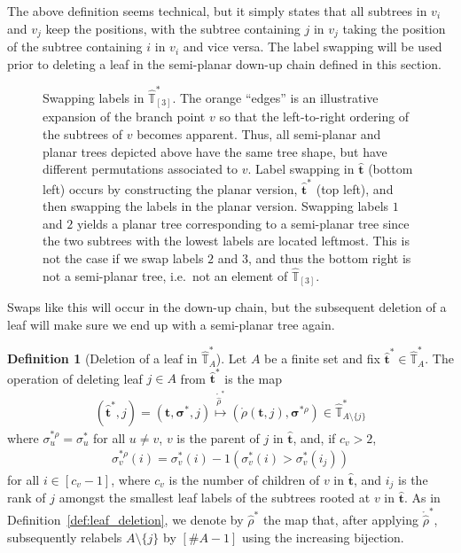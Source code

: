 \documentclass[a4paper, final]{amsart}
\theoremstyle{plain}
\theoremstyle{definition}
\newtheorem{defi}[thm]{Definition}
\newcommand{\tree}[1][t]{\boldsymbol{#1}}
\newcommand{\that}[1][t]{\hat{\boldsymbol{#1}}} %
\newcommand{\treesigma}[1][\sigma]{\boldsymbol{#1}}
\newcommand{\Thatspace}[1][\T]{\widehat{\boldsymbol{#1}}} %
\newcommand{\T}{\mathbb{T}}
\begin{document}
%
The above definition seems technical, but it simply states that all subtrees in $v_i$ and $v_j$ keep the positions, with the subtree containing $j$ in $v_j$ taking the position of the subtree containing $i$ in $v_i$ and vice versa.
%
  The label swapping will be used prior to deleting a leaf in the semi-planar down-up chain defined in this section.
  \begin{figure}[t]
    \centering
    
    \caption{Swapping labels in $\Thatspace_{[3]}^*$.
      The orange “edges” is an illustrative expansion of the branch point $v$ so that the left-to-right ordering of the subtrees of $v$ becomes apparent.
      Thus, all semi-planar and planar trees depicted above have the same tree shape, but have different permutations associated to $v$.
      Label swapping in $\that$ (bottom left) occurs by constructing the planar version, $\that^*$ (top left), and then swapping the labels in the planar version.
      Swapping labels $1$ and $2$ yields a planar tree corresponding to a semi-planar tree since the two subtrees with the lowest labels are located leftmost.
      This is not the case if we swap labels $2$ and $3$, and thus the bottom right is not a semi-planar tree, i.e.\ not an element of $\Thatspace_{[3]}$.
    }
    \label{fig:labelswapping}
  \end{figure}
  Swaps like this will occur in the down-up chain, but the subsequent deletion of a leaf will make sure we end up with a semi-planar tree again.
%
\begin{defi}[Deletion of a leaf in $\Thatspace_A^*$]\label{deletionplanaraug}
    Let $A$ be a finite set and fix $\that^* \in \Thatspace_A^*$.
    The operation of deleting leaf $j \in A$ from $\that^*$ is the map
    \begin{align}
        \left( \that^*, j \right)
        = \left( \tree, \treesigma^*, j \right)
        \overset{\mathring{\hat{\rho}}^*}{\mapsto}
        \left( \mathring{\rho} \left( \tree, j \right), \treesigma^{* \rho} \right)
        \in \Thatspace_{A \setminus \{j\}}^*
        \label{eq:deletionmapplanaraug}
    \end{align}
    where $\sigma_u^{* \rho} = \sigma_u^*$ for all $u \neq v$, $v$ is the parent of $j$ in $\that$, and, if $c_v > 2$,
    \begin{align}
      \label{eq:deletionpermutation}
      \sigma_v^{* \rho} (i)
      =
      \sigma_v^*(i) - 1 \left( \sigma_v^*(i) > \sigma_v^* (i_j) \right)
    \end{align}
    for all $i \in [c_v - 1]$, where $c_v$ is the number of children of $v$ in $\that$, and $i_j$ is the rank of $j$ amongst the smallest leaf labels of the subtrees rooted at $v$ in $\that$.
    As in Definition~\ref{def:leaf_deletion}, we denote by $\hat{\rho}^*$ the map that, after applying $\mathring{\hat{\rho}}^*$, subsequently relabels $A \setminus \{j\}$ by $[\# A - 1]$ using the increasing bijection.
\end{defi}
\end{document}
